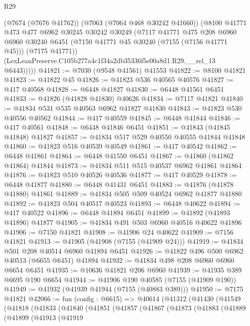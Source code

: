 \begin{lexlean}{R29}
\begin{coremodule}
          (@7674 (@7676 @41762))
          (@7063 (@7064 @468 @30242 @41660))
          (@8100
            @41771
            @473
            @477
            @6962
            @30245
            @30242
            @30249
            (@7117
              @41771
              @475
              @208
              @6960
              @6960
              @30240
              @6451
              (@7150 @41771 @45 @30240 (@7155 (@7156 @41771 @45)))
              (@7175 @41771))
            (LexLeanPreserve.C105b277a4c1f34a2db35336f5e00a8d1.R29.__rel_13 @6443)))))
@41821 := @7030 (@9548 @41561) @41553
@41822 := @8100 @41821
@41823 := @41822 @45
@41826 := @41823 @536 @40565 @40576
@41827 := @417 @40568
@41828 := @6448 @41827
@41830 := @6448 @41561 @6451
@41833 := @41826 (@41828 @41830) @40626
@41834 := @7117 @41821
@41840 := @41834 @531 @535 @40563 @6962 @41827 @41830
@41843 := @41823 @530 @40556 @40562
@41844 := @417 @40559
@41845 := @6448 @41844
@41846 := @417 @40561
@41848 := @6448 @41846 @6451
@41851 := @41843 (@41845 @41848) @41827
@41857 := @41834 @517 @529 @40550 @40555 @41844 @41848
@41860 := @41823 @516 @40539 @40549
@41861 := @417 @40542
@41862 := @6448 @41861
@41864 := @6448 @41550 @6451
@41867 := @41860 (@41862 @41864) @41844
@41873 := @41834 @511 @515 @40537 @6962 @41861 @41864
@41876 := @41823 @510 @40526 @40536
@41877 := @417 @40529
@41878 := @6448 @41877
@41880 := @6448 @41431 @6451
@41883 := @41876 (@41878 @41880) @41861
@41889 := @41834 @505 @509 @40524 @6962 @41877 @41880
@41892 := @41823 @504 @40517 @40523
@41893 := @6448 @40622
@41894 := @417 @40522
@41896 := @6448 @41894 @6451
@41899 := @41892 (@41893 @41896) @41877
@41905 := @41834 @491 @503 @6960 @40516 @40622 @41896
@41906 := @7150 @41821
@41908 := @41906 @24 @40622
@41909 := @7156 @41821
@41913 := @41905 (@41908 (@7155 (@41909 @24)))
@41919 := @41834 @501 @208 @40514 @6960 @41894 @6451
@41926 := @41822 @496 @500 @6962 @40513 (@6655 @6451) @41894
@41932 := @41834 @498 @208 @6960 @6960 @6654 @6451
@41935 := @10636 @41821 @206 @6960
@41939 := @41935 @389 @6695 @190 @6654
@41944 := @41906 @190 @40585 (@7155 (@41909 @190))
@41949 := @41932 (@41939 @41944 (@7155 (@40883 @389)))
@41950 := @7175 @41821
@42066 := fun (config : @6615) =>
  @40614
    (@41312
      (@41430
        (@41549
          (@41818
            (@41833
              (@41840
                (@41851
                  (@41857
                    (@41867
                      (@41873
                        (@41883
                          (@41889
                            (@41899
                              (@41913
                                (@41919

\end{coremodule}
\end{lexlean}
